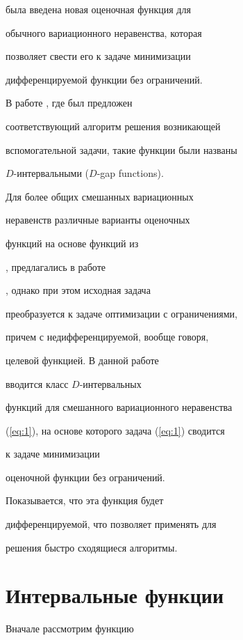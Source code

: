 была введена новая оценочная функция для 


обычного вариационного неравенства, которая


позволяет свести его к задаче минимизации 


дифференцируемой функции без ограничений.


В работе \cite{YTF97}, где был предложен


соответствующий алгоритм решения возникающей 


вспомогательной задачи, такие функции были названы 


$D$-интервальными ($D$-gap functions).





Для более общих смешанных вариационных 


неравенств различные варианты оценочных 


функций на основе функций из


\cite{Auc89}, \cite{Fuk92} предлагались в работе


\cite{Pat97}, однако при этом исходная задача


преобразуется к задаче оптимизации с ограничениями, 


причем с недифференцируемой, вообще говоря,


целевой функцией. В данной работе


вводится класс $D$-интервальных 


функций для смешанного вариационного неравенства 


(\ref{eq:1}), на основе которого задача (\ref{eq:1}) сводится 


к задаче минимизации 


оценочной функции без ограничений.


Показывается, что эта функция будет


дифференцируемой, что позволяет применять для


решения быстро сходящиеся алгоритмы.








\section{Интервальные функции}





Вначале рассмотрим функцию


